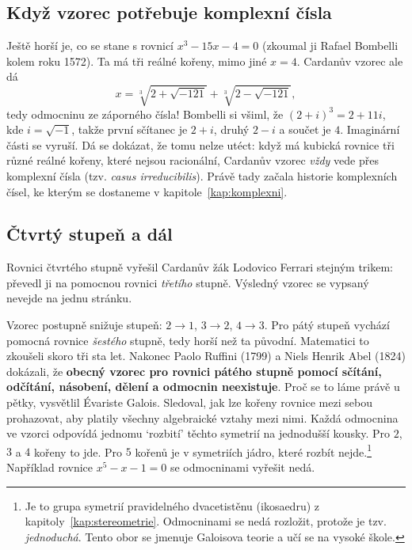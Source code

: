 \subsection*{Když vzorec potřebuje komplexní čísla}

Ještě horší je, co se stane s rovnicí $x^3 - 15x - 4 = 0$ (zkoumal ji Rafael Bombelli kolem roku 1572). Ta má tři reálné kořeny, mimo jiné $x = 4$. Cardanův vzorec ale dá
\begin{equation*}
  x = \sqrt[3]{2 + \sqrt{-121}} + \sqrt[3]{2 - \sqrt{-121}},
\end{equation*}
tedy odmocninu ze záporného čísla! Bombelli si všiml, že ${(2 + i)}^3 = 2 + 11i$, kde $i = \sqrt{-1}$, takže první sčítanec je $2 + i$, druhý $2 - i$ a součet je $4$. Imaginární části se vyruší. Dá se dokázat, že tomu nelze utéct: když má kubická rovnice tři různé reálné kořeny, které nejsou racionální, Cardanův vzorec \textit{vždy} vede přes komplexní čísla (tzv. \textit{casus irreducibilis}). Právě tady začala historie komplexních čísel, ke kterým se dostaneme v kapitole~\ref{kap:komplexni}.

\subsection*{Čtvrtý stupeň a dál}

Rovnici čtvrtého stupně vyřešil Cardanův žák Lodovico Ferrari stejným trikem: převedl ji na pomocnou rovnici \textit{třetího} stupně. Výsledný vzorec se vypsaný nevejde na jednu stránku.

Vzorec postupně snižuje stupeň: $2\to 1$, $3\to 2$, $4\to 3$. Pro pátý stupeň vychází pomocná rovnice \textit{šestého} stupně, tedy horší než ta původní. Matematici to zkoušeli skoro tři sta let. Nakonec Paolo Ruffini (1799) a Niels Henrik Abel (1824) dokázali, že \textbf{obecný vzorec pro rovnici pátého stupně pomocí sčítání, odčítání, násobení, dělení a odmocnin neexistuje}. Proč se to láme právě u pětky, vysvětlil Évariste Galois. Sledoval, jak lze kořeny rovnice mezi sebou prohazovat, aby platily všechny algebraické vztahy mezi nimi. Každá odmocnina ve vzorci odpovídá jednomu `rozbití' těchto symetrií na jednodušší kousky. Pro $2$, $3$ a $4$ kořeny to jde. Pro $5$ kořenů je v symetriích jádro, které rozbít nejde.\footnote{Je to grupa symetrií pravidelného dvacetistěnu (ikosaedru) z kapitoly~\ref{kap:stereometrie}. Odmocninami se nedá rozložit, protože je tzv. \textit{jednoduchá}. Tento obor se jmenuje Galoisova teorie a učí se na vysoké škole.} Například rovnice $x^5 - x - 1 = 0$ se odmocninami vyřešit nedá.

